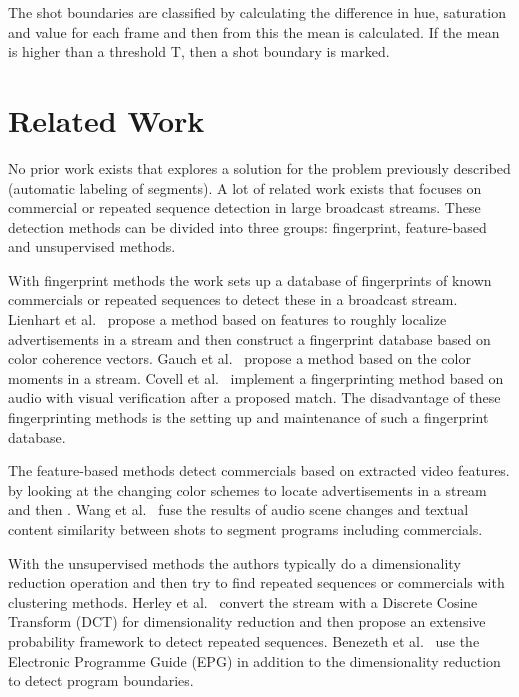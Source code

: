 \documentclass{article}
\begin{document}
The shot boundaries are classified by calculating the difference in hue, saturation and value for each frame and then from this the mean is calculated. If the mean is higher than a threshold T, then a shot boundary is marked.

\section{Related Work} \label{relatedwork}

No prior work exists that explores a solution for the problem previously described (automatic labeling of segments).  A lot of related work exists that focuses on commercial or repeated sequence detection in large broadcast streams. These detection methods can be divided into three groups: fingerprint, feature-based and unsupervised methods. 

With fingerprint methods the work sets up a database of fingerprints of known commercials or repeated sequences to detect these in a broadcast stream. Lienhart et al.\ \cite{lienhart1997detection} propose a method based on features to roughly localize advertisements in a stream and then construct a fingerprint database based on color coherence vectors. Gauch et al.\ \cite{gauch2006finding} propose a method based on the color moments in a stream. Covell et al.\ \cite{covell2006advertisement} implement a fingerprinting method based on audio with visual verification after a proposed match. The disadvantage of these fingerprinting methods is the setting up and maintenance of such a fingerprint database. 


The feature-based methods detect commercials based on extracted video features.  by looking at the changing color schemes to locate advertisements in a stream and then . Wang et al.\ \cite{wang2008multimodal} fuse the results of audio scene changes and textual content similarity between shots to segment programs including commercials.

With the unsupervised methods the authors typically do a dimensionality reduction operation and then try to find repeated sequences or commercials with clustering methods. Herley et al.\ \cite{herley2006argos} convert the stream with a Discrete Cosine Transform (DCT) for dimensionality reduction and then propose an extensive probability framework to detect repeated sequences. Benezeth et al.\ \cite{benezeth2010unsupervised} use the Electronic Programme Guide (EPG) in addition to the dimensionality reduction to detect program boundaries.
\end{document}
